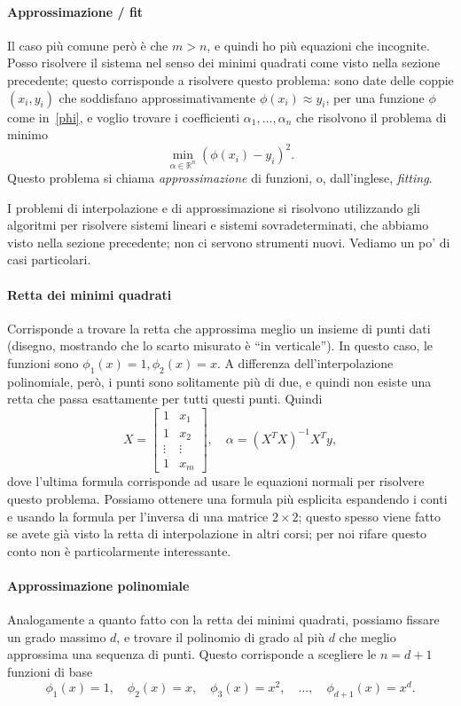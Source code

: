 \documentclass[a4paper]{report}
\theoremstyle{definiton}
\theoremstyle{remark}
\begin{document}
\paragraph{Approssimazione / fit} Il caso più comune però è che $m>n$, e quindi ho più equazioni che incognite. Posso risolvere il sistema nel senso dei minimi quadrati come visto nella sezione precedente; questo corrisponde a risolvere questo problema: sono date delle coppie $(x_i,y_i)$ che soddisfano approssimativamente $\phi(x_i) \approx y_i$, per una funzione $\phi$ come in~\eqref{phi}, e voglio trovare i coefficienti $\alpha_1,\dots,\alpha_n$ che risolvono il problema di minimo
\[
\min_{\alpha \in \mathbb{R}^n} (\phi(x_i) - y_i)^2.
\]
Questo problema si chiama \emph{approssimazione} di funzioni, o, dall'inglese, \emph{fitting}. 

I problemi di interpolazione e di approssimazione si risolvono utilizzando gli algoritmi per risolvere sistemi lineari e sistemi sovradeterminati, che abbiamo visto nella sezione precedente; non ci servono strumenti nuovi. Vediamo un po' di casi particolari.

\paragraph{Retta dei minimi quadrati} Corrisponde a trovare la retta che approssima meglio un insieme di punti dati (disegno, mostrando che lo scarto misurato è ``in verticale''). In questo caso, le funzioni sono $\phi_1(x) = 1, \phi_2(x) = x$. A differenza dell'interpolazione polinomiale, però, i punti sono solitamente più di due, e quindi non esiste una retta che passa esattamente per tutti questi punti. Quindi
\[
X = \begin{bmatrix}
    1 & x_1\\
    1 & x_2\\
    \vdots & \vdots\\
    1 & x_m
\end{bmatrix}, \quad \alpha = (X^TX)^{-1} X^T y,
\]
dove l'ultima formula corrisponde ad usare le equazioni normali per risolvere questo problema. Possiamo ottenere una formula più esplicita espandendo i conti e usando la formula per l'inversa di una matrice $2\times 2$; questo spesso viene fatto se avete già visto la retta di interpolazione in altri corsi; per noi rifare questo conto non è particolarmente interessante.


\paragraph{Approssimazione polinomiale}
Analogamente a quanto fatto con la retta dei minimi quadrati, possiamo fissare un grado massimo $d$, e trovare il polinomio di grado al più $d$ che meglio approssima una sequenza di punti. Questo corrisponde a scegliere le $n = d+1$ funzioni di base
\begin{equation} \label{basepolinomi}
    \phi_1(x) = 1, \quad \phi_2(x) = x, \quad \phi_3(x) = x^2,\quad \dots,\quad \phi_{d+1}(x) = x^{d}.    
\end{equation}
\end{document}

